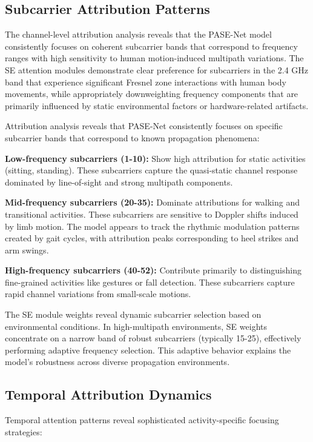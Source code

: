 \documentclass[journal]{IEEEtran}
\begin{document}
\subsection{Subcarrier Attribution Patterns}

The channel-level attribution analysis reveals that the PASE-Net model consistently focuses on coherent subcarrier bands that correspond to frequency ranges with high sensitivity to human motion-induced multipath variations. The SE attention modules demonstrate clear preference for subcarriers in the 2.4 GHz band that experience significant Fresnel zone interactions with human body movements, while appropriately downweighting frequency components that are primarily influenced by static environmental factors or hardware-related artifacts.

Attribution analysis reveals that PASE-Net consistently focuses on specific subcarrier bands that correspond to known propagation phenomena:

\textbf{Low-frequency subcarriers (1-10):} Show high attribution for static activities (sitting, standing). These subcarriers capture the quasi-static channel response dominated by line-of-sight and strong multipath components.

\textbf{Mid-frequency subcarriers (20-35):} Dominate attributions for walking and transitional activities. These subcarriers are sensitive to Doppler shifts induced by limb motion. The model appears to track the rhythmic modulation patterns created by gait cycles, with attribution peaks corresponding to heel strikes and arm swings.

\textbf{High-frequency subcarriers (40-52):} Contribute primarily to distinguishing fine-grained activities like gestures or fall detection. These subcarriers capture rapid channel variations from small-scale motions.

The SE module weights reveal dynamic subcarrier selection based on environmental conditions. In high-multipath environments, SE weights concentrate on a narrow band of robust subcarriers (typically 15-25), effectively performing adaptive frequency selection. This adaptive behavior explains the model's robustness across diverse propagation environments.

\subsection{Temporal Attribution Dynamics}

Temporal attention patterns reveal sophisticated activity-specific focusing strategies:
\end{document}
